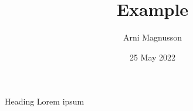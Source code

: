\documentclass[aspectratio=169]{beamer}
\begin{document}
\begin{frame}
  \title{Example}
  \author{Arni Magnusson}
  \date{25 May 2022}
  \titlepage
\end{frame}

\begin{frame}{Heading}
  Lorem ipsum
\end{frame}
\end{document}
